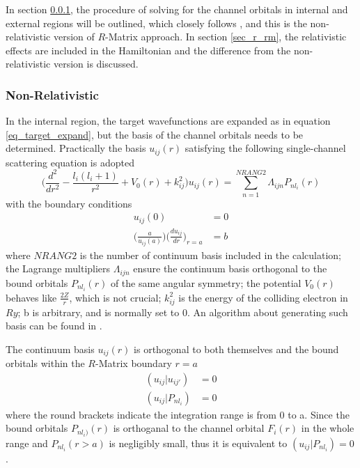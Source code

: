 In section \ref{sec_nr_rm}, the procedure of solving for the channel orbitals in internal and external regions will be outlined, which closely follows \citet{rm_3}, and this is the non-relativistic version of $R$-Matrix approach. In section \ref{sec_r_rm}, the relativistic effects \citep{rm_2} are included in the Hamiltonian and the difference from the non-relativistic version is discussed.

\subsubsection{Non-Relativistic} \label{sec_nr_rm}
In the internal region, the target wavefunctions are expanded as in equation \ref{eq_target_expand}, but the basis of the channel orbitals needs to be determined. Practically the basis $u_{ij}(r)$ satisfying the following single-channel scattering equation is adopted
\begin{equation} \label{eq_single_channel}
	\Bigg(\frac{d^2}{dr^2} - \frac{l_i(l_i+1)}{r^2} + V_0(r) + k_{ij}^2\Bigg) u_{ij}(r) = \sum_{n=1}^{NRANG2} \Lambda_{ijn} P_{nl_i}(r)
\end{equation}
with the boundary conditions
\begin{equation} \label{eq_boundary_condition}
	\begin{split}
		u_{ij}(0) &= 0 \\
		\Bigg(\frac{a}{u_{ij}(a)} \Bigg) \Bigg(\frac{du_{ij}}{dr} \Bigg)_{r=a} &=b
	\end{split}
\end{equation}
where $NRANG2$ is the number of continuum basis included in the calculation; the Lagrange multipliers $\Lambda_{ijn}$ ensure the continuum basis orthogonal to the bound orbitals $P_{nl_i}(r)$ of the same angular symmetry; the potential $V_0(r)$ behaves like $\frac{2Z}{r}$, which is not crucial; $k_{ij}^2$ is the energy of the colliding electron in $Ry$; b is arbitrary, and is normally set to 0. An algorithm about generating such basis can be found in \citet{cont_orbital}.

The continuum basis $u_{ij}(r)$ is orthogonal to both themselves and the bound orbitals within the $R$-Matrix boundary $r=a$
\begin{equation}
	\begin{split}
		(u_{ij}|u_{ij'}) &= 0\\
		(u_{ij}|P_{nl_i}) &= 0
	\end{split}
\end{equation}
where the round brackets indicate the integration range is from 0 to a. Since the bound orbitals $P_{nl_i)}(r)$ is orthoganal to the channel orbital $F_i(r)$ in the whole range and $P_{nl_i}(r>a)$ is negligibly small, thus it is equivalent to $(u_{ij}|P_{nl_i}) = 0$.

